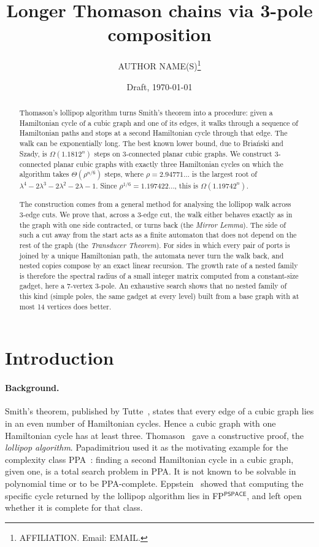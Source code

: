 \documentclass[11pt]{article}
\title{Longer Thomason chains via 3-pole composition}
\author{AUTHOR NAME(S)\thanks{AFFILIATION. Email: EMAIL.}}
\date{Draft, \today}
\theoremstyle{definition}
\begin{document}
\maketitle

\begin{abstract}
Thomason's lollipop algorithm turns Smith's theorem into a procedure: given a Hamiltonian cycle
of a cubic graph and one of its edges, it walks through a sequence of Hamiltonian paths and
stops at a second Hamiltonian cycle through that edge. The walk can be exponentially long. The
best known lower bound, due to Bria\'nski and Szady, is $\Omega(1.1812^n)$ steps on 3-connected
planar cubic graphs. We construct 3-connected planar cubic graphs with exactly three Hamiltonian
cycles on which the algorithm takes $\Theta(\rho^{n/6})$ steps, where
$\rho = 2.94771\ldots$ is the largest root of $\lambda^4-2\lambda^3-2\lambda^2-2\lambda-1$. Since
$\rho^{1/6} = 1.197422\ldots$, this is $\Omega(1.19742^n)$.

The construction comes from a general method for analysing the lollipop walk across 3-edge cuts.
We prove that, across a 3-edge cut, the walk either behaves exactly as in the graph with one
side contracted, or turns back (the \emph{Mirror Lemma}). The side of such a cut away from the
start acts as a finite automaton that does not depend on the rest of the graph (the
\emph{Transducer Theorem}).
For sides in which every pair of ports is joined by a unique Hamiltonian path, the automata never
turn the walk back, and nested copies compose by an exact linear recursion. The growth rate of a
nested family is therefore the spectral radius of a small integer matrix computed from a
constant-size gadget, here a 7-vertex 3-pole. An exhaustive search shows that no nested family of
this kind (simple poles, the same gadget at every level) built from a base graph with at most 14
vertices does better.
\end{abstract}

\section{Introduction}

\paragraph{Background.} Smith's theorem, published by Tutte~\cite{Tutte46}, states that every edge
of a cubic graph lies in an even number of Hamiltonian cycles. Hence a cubic graph with one
Hamiltonian cycle has at least three. Thomason~\cite{Thomason78} gave a constructive proof, the
\emph{lollipop algorithm}. Papadimitriou used it as the motivating example for the complexity
class PPA~\cite{Papadimitriou94}: finding a second Hamiltonian cycle in a cubic graph, given one,
is a total search problem in PPA. It is not known to be solvable in polynomial time or to be
PPA-complete. Eppstein~\cite{Eppstein23} showed that computing the specific cycle returned by the
lollipop algorithm lies in FP$^{\textsf{PSPACE}}$, and left open whether it is complete for that
class.
\end{document}
